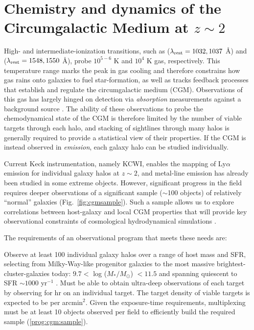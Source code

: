 \documentclass[11pt,a4paper,twoside,onecolumn,openany,final,oldfontcommands]{memoir}
\begin{document}


\section{Chemistry and dynamics of the Circumgalactic Medium at $z\sim2$}

High- and intermediate-ionization transitions, such as  ($\lambda_{\rm rest} = 1032, 1037$ \AA) and  ($\lambda_{\rm rest} = 1548, 1550$ \AA), probe $10^{5-6}$ K and $10^4$ K gas, respectively.  This temperature range marks the peak in gas cooling and therefore constrains how gas rains onto galaxies to fuel star-formation, as well as tracks feedback processes that establish and regulate the circumgalactic medium (CGM).  Observations of this gas has largely hinged on detection via \textit{absorption} measurements against a background source .  The ability of these observations to probe the chemodynamical state of the CGM is therefore limited by the number of viable targets through each halo, and stacking of sightlines through many halos is generally required to provide a statistical view of their properties.  If the CGM is instead observed in \textit{emission}, each galaxy halo can be studied individually.

Current Keck instrumentation, namely KCWI, enables the mapping of Ly$\alpha$ emission for individual galaxy halos at $z\sim2$, and metal-line emission has already been studied in some extreme objects. However, significant progress in the field requires deeper observations of a significant sample ($\sim$100 objects) of relatively ``normal'' galaxies (Fig.~\ref{fig:cgmsample}).  Such a sample allows us to explore correlations between host-galaxy and local CGM properties that will provide key observational constraints of cosmological hydrodynamical simulations .

The requirements of an observational program that meets these needs are:

\begin{programrequirement}
\reqitem Observe at least 100 individual galaxy halos over a range of host mass and SFR, selecting from Milky-Way-like progenitor galaxies to the most massive brightest-cluster-galaxies today: $9.7 <$ log ($M_*/M_\odot$) $< 11.5$ and spanning quiescent to SFR $\sim 1000$ yr$^{-1}$ . \label{prog:cgm:sample}
\reqitem Must be able to obtain ultra-deep observations of each target by observing for  hr on an individual target.
\reqitem The target density of viable targets is expected to be  per arcmin$^2$.  Given the exposure-time requirements, multiplexing must be at least 10 objects observed per field to efficiently build the required sample (\ref{prog:cgm:sample}).
\end{programrequirement}
\end{document}

